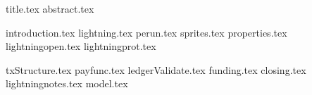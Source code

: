 \documentclass[11pt]{llncs}
\begin{document}
{title.tex}
\thispagestyle{plain}
{abstract.tex}

{introduction.tex}
{lightning.tex}
{perun.tex}
{sprites.tex}
{properties.tex}
{lightningopen.tex}
{lightningprot.tex}

{txStructure.tex}
{payfunc.tex}
{ledgerValidate.tex}
{funding.tex}
{closing.tex}
{lightningnotes.tex}
{model.tex}

\end{document}
